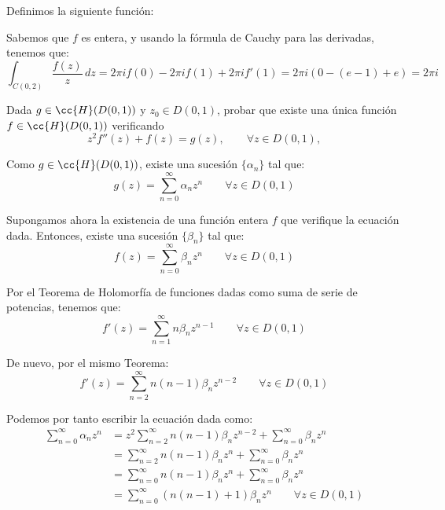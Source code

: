 \documentclass[12pt]{article}
\begin{document}
\begin{ejercicio}
\begin{enumerate}
            Definimos la siguiente función:

            Sabemos que $f$ es entera, y usando la fórmula de Cauchy para las derivadas, tenemos que:
            \begin{equation*}
                \int_{C(0,2)} \dfrac{f(z)}{z} \, dz = 2\pi i f(0) - 2\pi i f(1) + 2\pi i f'(1) = 2\pi i \left(0 - (e-1) + e\right) = 2\pi i
            \end{equation*}
        \end{enumerate}
    \end{ejercicio}

    \begin{ejercicio}[3.5 puntos]
        Dada $g\in \cc{H}(D(0,1))$ y $z_0\in D(0,1)$, probar que existe una única función $f\in \cc{H}(D(0,1))$ verificando
        \begin{equation*}
            z^2f''(z)+ f(z) = g(z),\qquad \forall z\in D(0,1),
        \end{equation*}

        Como $g\in \cc{H}(D(0,1))$, existe una sucesión $\{\alpha_n\}$ tal que:
        \begin{equation*}
            g(z) = \sum_{n=0}^{\infty} \alpha_n z^n \qquad \forall z\in D(0,1)
        \end{equation*}

        Supongamos ahora la existencia de una función entera $f$ que verifique la ecuación dada. Entonces, existe una sucesión $\{\beta_n\}$ tal que:
        \begin{equation*}
            f(z) = \sum_{n=0}^{\infty} \beta_n z^n \qquad \forall z\in D(0,1)
        \end{equation*}

        Por el Teorema de Holomorfía de funciones dadas como suma de serie de potencias, tenemos que:
        \begin{equation*}
            f'(z) = \sum_{n=1}^{\infty} n \beta_n z^{n-1} \qquad \forall z\in D(0,1)
        \end{equation*}

        De nuevo, por el mismo Teorema:
        \begin{equation*}
            f'(z) = \sum_{n=2}^{\infty} n(n-1) \beta_n z^{n-2} \qquad \forall z\in D(0,1)
        \end{equation*}

        Podemos por tanto escribir la ecuación dada como:
        \begin{align*}
            \sum_{n=0}^{\infty} \alpha_n z^n &= z^2\sum_{n=2}^{\infty} n(n-1) \beta_n z^{n-2} + \sum_{n=0}^{\infty} \beta_n z^n\\
            &= \sum_{n=2}^{\infty} n(n-1) \beta_n z^n + \sum_{n=0}^{\infty} \beta_n z^n\\
            &= \sum_{n=0}^{\infty} n(n-1) \beta_n z^n + \sum_{n=0}^{\infty} \beta_n z^n\\
            &= \sum_{n=0}^{\infty} (n(n-1)+1)\beta_n z^n\qquad \forall z\in D(0,1)
        \end{align*}


\end{ejercicio}
\end{document}
